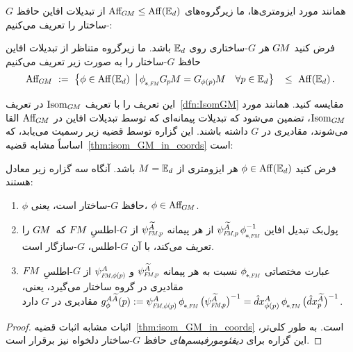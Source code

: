 همانند مورد ایزومتری‌ها، ما زیرگروه‌های $\operatorname{Aff}_{\mkern-2muG\mkern-1.4muM} \leq \operatorname{Aff}(\mathbb{E}_d)$ از تبدیلات افاین حافظ $G$-ساختار را تعریف می‌کنیم:
\begin{dfn}
	\label{dfn:AffGM}
	فرض کنید $G\mkern-1.4muM$ هر $G$-ساختاری روی $\mathbb{E}_d$ باشد.
	ما زیرگروه متناظر از تبدیلات افاین حافظ $G$-ساختار را به صورت زیر تعریف می‌کنیم
	\begin{align}
		\AffGM\ :=\ \big\{ \phi \in \AffE 
		\,\big|\, \dphiFM \GpM = \GphipM\ \ \ \forall p \in \Euc_d \big\} 
		\,\ \leq\ \AffE \,.
	\end{align}
\end{dfn}
این تعریف را با تعریف $\operatorname{Isom}_{G\mkern-1.4muM}$ در تعریف~\ref{dfn:IsomGM} مقایسه کنید.
همانند مورد $\operatorname{Isom}_{G\mkern-1.4muM}$، تضمین می‌شود که تبدیلات پیمانه‌ای که توسط تبدیلات افاین در $\operatorname{Aff}_{\mkern-2muG\mkern-1.4muM}$ القا می‌شوند، مقادیری در $G$ داشته باشند.
این گزاره توسط قضیه زیر رسمیت می‌یابد، که اساساً مشابه قضیه~\ref{thm:isom_GM_in_coords} است:
\begin{thm}
	\label{thm:Aff_GM_in_gauges}
	فرض کنید $\phi \in \operatorname{Aff}(\mathbb{E}_d)$ هر ایزومتری از $M=\mathbb{E}_d$ باشد.
	آنگاه سه گزاره زیر معادل هستند:
	\begin{enumerate}
		\item $\phi$ حافظ $G$-ساختار است، یعنی، $\phi \in \operatorname{Aff}_{\mkern-2muG\mkern-1.4muM}$.
		\item پول‌بک تبدیل افاین $\psiFMp^{\widetilde{A}}\, \dphiFM^{-1}$ از هر پیمانه $\psiFMp^{\widetilde{A}}$ از $G$-اطلسِ $F\mkern-1.5muM$ که~$G\mkern-1.4muM$ را تعریف می‌کند، با آن $G$-اطلس، $G$-سازگار است.
		\item
		عبارت مختصاتی $\dphiFM$ نسبت به هر پیمانه $\psiFMp^{\widetilde{A}}$ و $\psiFMphip^A$ از $G$-اطلسِ $F\mkern-1.5muM$ مقادیری در گروه ساختار می‌گیرد، یعنی،
		${g_\phi^{A\widetilde{A}}(p)
			:= \psiFMphip^A \,\dphiFM\, \big(\psiFMp^{\widetilde{A}} \big)^{-1}}
		= \hat{d}x^A_{\phi(p)} \,\dphiTM\, \big(\hat{d}x^{\widetilde{A}}_p \big)^{-1}$
		مقادیری در $G$ دارد.
	\end{enumerate}
\end{thm}
\begin{proof}
	اثبات مشابه اثبات قضیه~\ref{thm:isom_GM_in_coords} است.
	به طور کلی‌تر، این گزاره برای \emph{دیفئومورفیسم‌های} حافظ $G$-ساختار دلخواه نیز برقرار است.
\end{proof}


